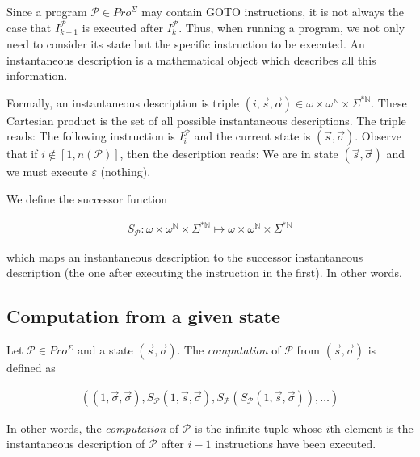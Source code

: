 \documentclass[a4paper, 12pt]{article}
\begin{document}
Since a program $\mathcal{P} \in Pro^{\Sigma}$ may contain GOTO instructions,
it is not always the case that $I_{k+1}^{\mathcal{P}}$ is executed after
$I_k^{\mathcal{P}}$. Thus, when running a program, we not only need to consider
its state but the specific instruction to be executed. An instantaneous
description is a mathematical object which describes all this information.

Formally, an instantaneous description is triple $(i, \overrightarrow{s},
\overrightarrow{\alpha}) \in \omega \times \omega^{\mathbb{N}} \times
\Sigma^{*\mathbb{N}}$. These Cartesian product is the set of all possible
instantaneous descriptions. The triple reads: The following instruction is
$I_{i}^{\mathcal{P}}$ and the current state is $(\overrightarrow{s},
\overrightarrow{\sigma})$. Observe that if $i \not\in [1, n(\mathcal{P})]$, then
the description reads: We are in state $(\overrightarrow{s},
\overrightarrow{\sigma})$ and we must execute $\varepsilon$ (nothing).

We define the successor function

\begin{align*}
    S_\mathcal{P} : \omega \times \omega^{\mathbb{N}} \times
    \Sigma^{*\mathbb{N}} \mapsto  \omega \times \omega^{\mathbb{N}} \times \Sigma^{*\mathbb{N}}
\end{align*}

which maps an instantaneous description to the successor instantaneous
description (the one after executing the instruction in the first). In other
words, 

\subsection{Computation from a given state}

Let $\mathcal{P} \in Pro^{\Sigma}$ and a state  $(\overrightarrow{s},
\overrightarrow{\sigma})$. The \textit{computation} of $\mathcal{P}$ from
$(\overrightarrow{s}, \overrightarrow{\sigma})$ is defined as 

\begin{align*}
    \left(  (1, \overrightarrow{\sigma}, \overrightarrow{\sigma}),
    S_{\mathcal{P}}\left( 1, \overrightarrow{s}, \overrightarrow{\sigma}
\right), S_{\mathcal{P}} \left( S_{\mathcal{P}} \left( 1, \overrightarrow{s},
\overrightarrow{\sigma} \right)  \right), \ldots   \right) 
\end{align*}

In other words, the \textit{computation} of $\mathcal{P}$ is the infinite tuple
whose $i$th element is the instantaneous description of $\mathcal{P}$ after $i -
1$ instructions have been executed.
\end{document}
